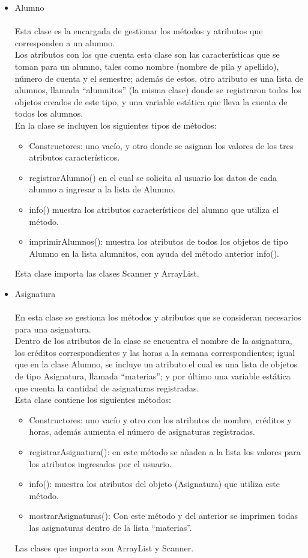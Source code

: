 \documentclass[12pt]{report}
\begin{document}
\begin{itemize}
\item Alumno\\ \\
Esta clase es la encargada de gestionar los métodos y atributos que corresponden a un alumno.\\
Los atributos con los que cuenta esta clase son las características que se toman para un alumno, tales como nombre (nombre de pila y apellido), número de cuenta y el semestre; además de estos, otro atributo es una lista de alumnos, llamada “alumnitos” (la misma clase) donde se registraron todos los objetos creados de este tipo, y una variable estática que lleva la cuenta de todos los alumnos.\\
En la clase se incluyen los siguientes tipos de métodos:
\begin{itemize}
    \item Constructores: uno vacío, y otro donde se asignan los valores de los tres atributos característicos.
    \item registrarAlumno() en el cual se solicita al usuario los datos de cada alumno a ingresar a la lista de Alumno.
    \item info() muestra los atributos característicos del alumno que utiliza el método.
    \item imprimirAlumnos(): muestra los atributos de todos los objetos de tipo Alumno en la lista alumnitos, con ayuda del método anterior info().
    \end{itemize}
Esta clase importa las clases Scanner y ArrayList.
\newpage
\item Asignatura \\ \\ 
En esta clase se gestiona los métodos y atributos que se consideran necesarios para una asignatura.\\
Dentro de los atributos de la clase se encuentra el nombre de la asignatura, los créditos correspondientes y las horas a la semana correspondientes; igual que en la clase Alumno, se incluye un atributo el cual es una lista de objetos de tipo Asignatura, llamada “materias”; y por último una variable estática que cuenta la cantidad de asignaturas registradas.\\
Esta clase contiene los siguientes métodos:
\begin{itemize}
\item Constructores: uno vacío y otro con los atributos de nombre, créditos y horas, además aumenta el número de asignaturas registradas.
\item registrarAsignatura(): en este método se añaden a la lista los valores para los atributos ingresados por el usuario.
\item info(): muestra los atributos del objeto (Asignatura) que utiliza este método.
\item mostrarAsignaturas(): Con este método y del anterior se imprimen todas las asignaturas dentro de la lista “materias”.
\end{itemize}
Las clases que importa son ArrayList y Scanner.\\



\end{itemize}
\end{document}
